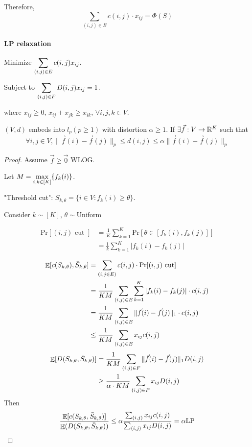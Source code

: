 Therefore, 
\[\sum_{(i,j)\in E}c(i,j)\cdot x_{ij}=\Phi(S)\]

\paragraph{LP relaxation}

Minimize  $ \displaystyle\sum_{(i,j)\in E}c(i,j)x_{ij} $.

Subject to  $ \displaystyle\sum_{(i,j)\in F}D(i,j)x_{ij}=1 $. 

where  $ x_{ij} \geq 0 $,  $ x_{ij}+x_{jk} \geq x_{ik} $,  $ \forall i,j,k\in V $.

\begin{definition}
    $ (V,d) $ embeds into  $ l_p(p \geq 1) $ with distortion  $ \alpha \geq 1 $. If  $ \exists \vec{f}:V\rightarrow \mathbb R^K $ such that 
\[\forall i,j\in V,\|\vec{f}(i)-\vec{f}(j)\|_p \leq d(i,j) \leq \alpha\|\vec{f}(i)-\vec{f}(j)\|_p\]
\end{definition}
\begin{proof}
    Assume  $ \vec{f} \geq \vec{0} $ WLOG.
    
    Let  $ M=\displaystyle\max_{i,k\in [K]}\{f_k(i)\} $.
    
    "Threshold cut":  $ S_{k,\theta}=\{i\in V:f_k(i) \geq \theta\} $. 

    Consider  $ k\sim [K] $,  $ \theta\sim \mathrm{Uniform} $  

    
    \begin{align*}
        \mathrm{Pr}[(i,j)\text{ cut }]&=\frac{1}{K}\sum_{k=1}^K\mathrm{Pr}[\theta\in [f_k(i),f_k(j)]]\\
        &=\frac{1}{k}\sum_{k=1}^K|f_k(i)-f_k(j)| 
    \end{align*}

    \begin{align*}
        \mathop\mathbb E[c(S_{k,\theta}),\bar{S}_{k,\theta}]&=\sum_{(i,j\in E)}c(i,j)\cdot \mathrm{Pr}[(i,j)\text{ cut}]\\
        &=\frac{1}{KM}\sum_{(i,j)\in E}\sum_{k=1}^K|f_k(i)-f_k(j)|\cdot c(i,j)\\
        &=\frac{1}{KM}\sum_{(i,j)\in E}\|\vec{f}(i)-\vec{f}(j)\|_1\cdot c(i,j)\\
        & \leq \frac{1}{KM}\sum_{(i,j)\in E}x_{ij}c(i,j)
    \end{align*}
    \begin{align*}
        \mathop\mathbb E[D(S_{k,\theta},\bar{S}_{k,\theta})]&=\frac{1}{KM}\sum_{(i,j)\in F}\|\vec{f}(i)-\vec{f}(j)\|_1D(i,j)\\
        & \geq \frac{1}{\alpha\cdot KM}\sum_{(i,j)\in F}x_{ij}D(i,j)
    \end{align*}
    Then 
    \[\frac{\mathop\mathbb E[c(S_{k,\theta},\bar{S}_{k,\theta})]}{\mathop\mathbb E(D(S_{k,\theta},\bar{S}_{k,\theta}))} \leq \alpha\frac{\sum_{(i,j)}x_{ij}c(i,j)}{\sum_{(i,j)}x_{ij}D(i,j)}=\alpha \mathrm{LP}\]
\end{proof}

